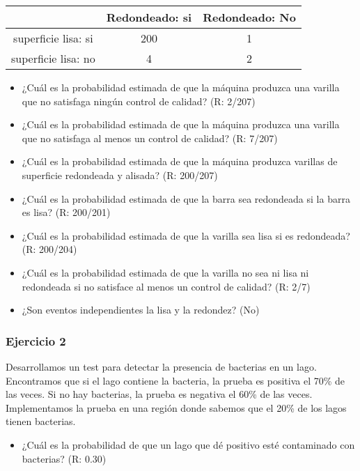 \documentclass[
]{book}
\providecommand{\tightlist}{%
  \setlength{\itemsep}{0pt}\setlength{\parskip}{0pt}}
\begin{document}
\begin{longtable}[]{@{}ccc@{}}
\toprule
& Redondeado: si & Redondeado: No \\
\midrule
\endhead
superficie lisa: si & 200 & 1 \\
superficie lisa: no & 4 & 2 \\
\bottomrule
\end{longtable}

\begin{itemize}
\item
  ¿Cuál es la probabilidad estimada de que la máquina produzca una varilla que no satisfaga ningún control de calidad? (R: 2/207)
\item
  ¿Cuál es la probabilidad estimada de que la máquina produzca una varilla que no satisfaga al menos un control de calidad? (R: 7/207)
\item
  ¿Cuál es la probabilidad estimada de que la máquina produzca varillas de superficie redondeada y alisada? (R: 200/207)
\item
  ¿Cuál es la probabilidad estimada de que la barra sea redondeada si la barra es lisa? (R: 200/201)
\item
  ¿Cuál es la probabilidad estimada de que la varilla sea lisa si es redondeada? (R: 200/204)
\item
  ¿Cuál es la probabilidad estimada de que la varilla no sea ni lisa ni redondeada si no satisface al menos un control de calidad? (R: 2/7)
\item
  ¿Son eventos independientes la lisa y la redondez? (No)
\end{itemize}

\hypertarget{ejercicio-2-1}{%
\subsubsection{Ejercicio 2}\label{ejercicio-2-1}}

Desarrollamos un test para detectar la presencia de bacterias en un lago. Encontramos que si el lago contiene la bacteria, la prueba es positiva el 70\% de las veces. Si no hay bacterias, la prueba es negativa el 60\% de las veces. Implementamos la prueba en una región donde sabemos que el 20\% de los lagos tienen bacterias.

\begin{itemize}
\tightlist
\item
  ¿Cuál es la probabilidad de que un lago que dé positivo esté contaminado con bacterias? (R: 0.30)
\end{itemize}
\end{document}
